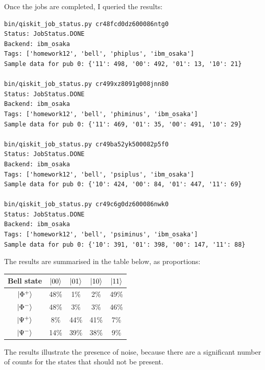 \documentclass[12pt]{extarticle}
\begin{document}
\begin{enumerate}[(a)]
Once the jobs are completed, I queried the results:
\begin{verbatim}
bin/qiskit_job_status.py cr48fcd0dz600086ntg0
Status: JobStatus.DONE
Backend: ibm_osaka
Tags: ['homework12', 'bell', 'phiplus', 'ibm_osaka']
Sample data for pub 0: {'11': 498, '00': 492, '01': 13, '10': 21}

bin/qiskit_job_status.py cr499xz8091g008jnn80
Status: JobStatus.DONE
Backend: ibm_osaka
Tags: ['homework12', 'bell', 'phiminus', 'ibm_osaka']
Sample data for pub 0: {'11': 469, '01': 35, '00': 491, '10': 29}

bin/qiskit_job_status.py cr49ba52yk500082p5f0
Status: JobStatus.DONE
Backend: ibm_osaka
Tags: ['homework12', 'bell', 'psiplus', 'ibm_osaka']
Sample data for pub 0: {'10': 424, '00': 84, '01': 447, '11': 69}

bin/qiskit_job_status.py cr49c6g0dz600086nwk0
Status: JobStatus.DONE
Backend: ibm_osaka
Tags: ['homework12', 'bell', 'psiminus', 'ibm_osaka']
Sample data for pub 0: {'10': 391, '01': 398, '00': 147, '11': 88}
\end{verbatim}

The results are summarised in the table below, as proportions:
\begin{center}
\begin{tabular}{|c|c|c|c|c|}
\hline
Bell state & $\ket{00}$ & $\ket{01}$ & $\ket{10}$ & $\ket{11}$ \\
\hline
$\ket{\Phi^{+}}$ & 48\% &  1\% &  2\% & 49\% \\
$\ket{\Phi^{-}}$ & 48\% &  3\% &  3\% & 46\% \\
$\ket{\Psi^{+}}$ &  8\% & 44\% & 41\% &  7\% \\
$\ket{\Psi^{-}}$ & 14\% & 39\% & 38\% &  9\% \\
\hline
\end{tabular}
\end{center}

The results illustrate the presence of noise, because there are a significant number of counts for the states that should not be present.




\end{enumerate}
\end{document}
